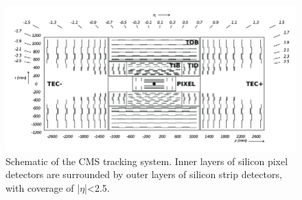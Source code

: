 \begin{figure}[htb]
\centering
  \includegraphics[width=0.7\linewidth]{plots/CMS/r-z-slice-of-the-CMS-Tracker.png}
  \caption{Schematic of the CMS tracking system. Inner layers of silicon pixel detectors are surrounded by outer layers of silicon strip detectors, with coverage of |$\eta$|<2.5.~ \protect\cite{CMS_tracker_diagram}}
  \label{fig:cms:tracker}
\end{figure}